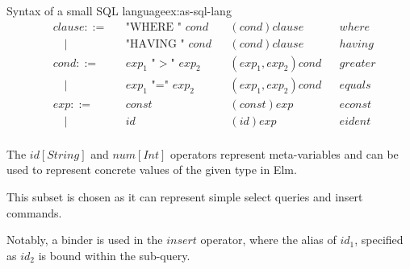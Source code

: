 \begin{example}{Syntax of a small SQL language}{ex:as-sql-lang}
\[\begin{aligned}
       & clause ::=  &  & \text{"WHERE " $cond$}          &   & (cond)clause            &  & where           \\
       & \quad |     &  & \text{"HAVING " $cond$}         &   & (cond)clause            &  & having          \\
       & cond ::=    &  & \text{$exp_1$ "$>$" $exp_2$}    &   & (exp_1,exp_2)cond       &  & greater         \\
       & \quad |     &  & \text{$exp_1$ "=" $exp_2$}      &   & (exp_1,exp_2)cond       &  & equals          \\
       & exp ::=     &  & \text{$const$}                  &   & (const)exp              &  & econst          \\
       & \quad |     &  & \text{$id$}                     &   & (id)exp                 &  & eident          \\
    \end{aligned}
  \]


  The $id[String]$ and $num[Int]$ operators represent meta-variables and can be used to represent concrete values of the given type in Elm.

  This subset is chosen as it can represent simple select queries and insert commands.

  Notably, a binder is used in the $insert$ operator, where the alias of $id_1$, specified as $id_2$ is bound within the sub-query.
\end{example}
\newpage

